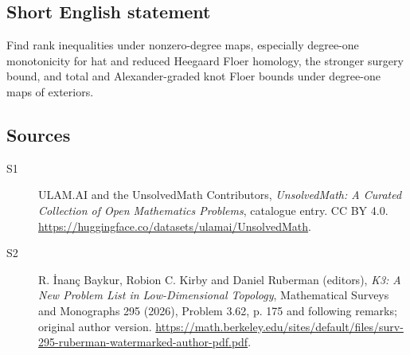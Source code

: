 \documentclass[11pt]{article}
\begin{document}
\subsection{Short English statement}
Find rank inequalities under nonzero-degree maps, especially degree-one monotonicity for hat and reduced Heegaard Floer homology, the stronger surgery bound, and total and Alexander-graded knot Floer bounds under degree-one maps of exteriors.
\subsection{Sources}
\begin{description}
\item[\hypertarget{source:statement:1}{S1}] ULAM.AI and the UnsolvedMath Contributors, \emph{UnsolvedMath: A Curated Collection of Open Mathematics Problems}, catalogue entry. CC BY 4.0. \url{https://huggingface.co/datasets/ulamai/UnsolvedMath}.
\item[\hypertarget{source:statement:2}{S2}] R. İnanç Baykur, Robion C. Kirby and Daniel Ruberman (editors), \emph{K3: A New Problem List in Low-Dimensional Topology}, Mathematical Surveys and Monographs 295 (2026), Problem 3.62, p. 175 and following remarks; original author version. \url{https://math.berkeley.edu/sites/default/files/surv-295-ruberman-watermarked-author-pdf.pdf}.
\end{description}
\label{end:statement}
\end{document}

